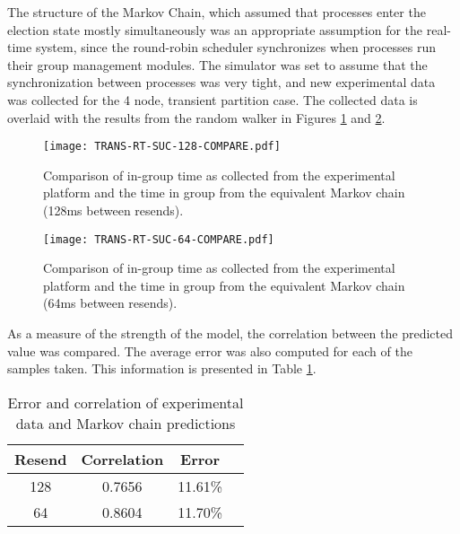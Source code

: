 The structure of the Markov Chain, which assumed that processes enter the election state
mostly simultaneously was an appropriate assumption for the real-time system, since the
round-robin scheduler synchronizes when processes run their group management modules. The
simulator was set to assume that the synchronization between processes was very tight, and
new experimental data was collected for the 4 node, transient partition case. The collected
data is overlaid with the results from the random walker in Figures \ref{fig:COMPARE-SUC-TRANS-RT-128} and \ref{fig:COMPARE-SUC-TRANS-RT-64}.

\begin{figure}[!h]
\centering
\texttt{[image: TRANS-RT-SUC-128-COMPARE.pdf]}

\caption{Comparison of in-group time as collected from the experimental platform and the time in group from the equivalent Markov chain (128ms between resends).}
\label{fig:COMPARE-SUC-TRANS-RT-128}
\end{figure}

\begin{figure}[!h]
\centering
\texttt{[image: TRANS-RT-SUC-64-COMPARE.pdf]}

\caption{Comparison of in-group time as collected from the experimental platform and the time in group from the equivalent Markov chain (64ms between resends).}
\label{fig:COMPARE-SUC-TRANS-RT-64}
\end{figure}

As a measure of the strength of the model, the correlation between the predicted value was compared.
The average error was also computed for each of the samples taken. This information is presented in
Table \ref{tab:STAT-DATA}.

\begin{table}
\caption{Error and correlation of experimental data and Markov chain predictions}
\label{tab:STAT-DATA}
\centering
\begin{tabular}{|c||c|c|c|} 
\hline
Resend & Correlation & Error \\ \hline
128 & 0.7656 & 11.61\% \\ \hline
64 & 0.8604 & 11.70\% \\ \hline 
\end{tabular}
\end{table}

